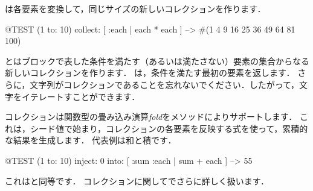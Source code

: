 \documentclass[a4paper,10pt,twoside]{book}
\begin{document}

は各要素を変換して，同じサイズの新しいコレクションを作ります．
\begin{code}{@TEST}
(1 to: 10) collect: [ :each | each * each ] --> #(1 4 9 16 25 36 49 64 81 100)
\end{code}

とはブロックで表した条件を満たす（あるいは満たさない）要素の集合からなる新しいコレクションを作ります．
は，条件を満たす最初の要素を返します．
さらに，文字列がコレクションであることを忘れないでください．したがって，文字をイテレートすことができます．


コレクションは関数型の畳み込み演算\emph{fold}をメソッドによりサポートします．
これは，シード値で始まり，コレクションの各要素を反映する式を使って，累積的な結果を生成します．
代表例は和と積です．


\begin{code}{@TEST}
(1 to: 10) inject: 0 into: [ :sum :each | sum + each ] --> 55
\end{code}

\noindent
これはと同等です．
コレクションに関してでさらに詳しく扱います．
\end{document}
